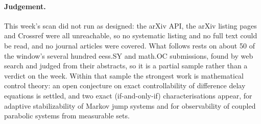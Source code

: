 \documentclass[11pt,a4paper]{article}
\begin{document}
\paragraph{Judgement.} This week's scan did not run as designed: the arXiv API, the arXiv listing pages and Crossref were all unreachable, so no systematic listing and no full text could be read, and no journal articles were covered. What follows rests on about 50 of the window's several hundred eess.SY and math.OC submissions, found by web search and judged from their abstracts, so it is a partial sample rather than a verdict on the week. Within that sample the strongest work is mathematical control theory: an open conjecture on exact controllability of difference delay equations is settled, and two exact (if-and-only-if) characterisations appear, for adaptive stabilizability of Markov jump systems and for observability of coupled parabolic systems from measurable sets.
\end{document}
